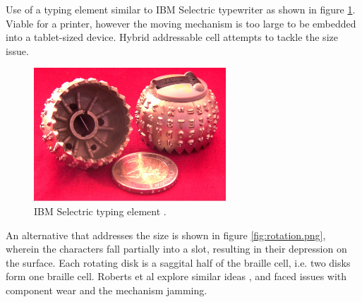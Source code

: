 Use of a typing element similar to IBM Selectric typewriter as shown in figure \ref{fig:IBM_Selectric_Globe_Wiki.jpg}. Viable for a printer, however the moving mechanism is too large to be embedded into a tablet-sized device. Hybrid addressable cell attempts to tackle the size issue.
\begin{figure}
\centering
    \includegraphics[height=5cm]{figures/IBM_Selectric_Globe_Wiki.jpg}
\caption[IBM Selectric typing element]{IBM Selectric typing element \cite{wiki:IBMSelectric}.}
\label{fig:IBM_Selectric_Globe_Wiki.jpg}
\end{figure}

An alternative that addresses the size is shown in figure \ref{fig:rotation.png}, wherein the characters fall partially into a slot, resulting in their depression on the surface. Each rotating disk is a saggital half of the braille cell, i.e. two disks form one braille cell.
Roberts et al explore similar ideas \cite{roberts_492_2000}, and faced issues with component wear and the mechanism jamming.


